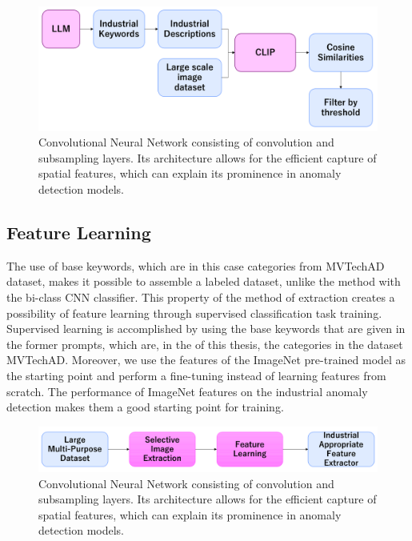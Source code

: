 \begin{figure}[h]
	\begin{center}
		\includegraphics[width=1.0\linewidth]{Chapter_3/llm_extraction.png}
	\end{center}
	\caption{Convolutional Neural Network consisting of convolution and subsampling layers. Its architecture allows for the efficient capture of spatial features, which can explain its prominence in anomaly detection models.}
	\label{fig:cnn}
\end{figure} 	

\subsection{Feature Learning}
\label{feature learning llm}
The use of base keywords, which are in this case categories from MVTechAD dataset, makes it possible to assemble a labeled dataset, unlike the method with the bi-class CNN classifier. This property of the method of extraction creates a possibility of feature learning through supervised classification task training. Supervised learning is accomplished by using the base keywords that are given in the former prompts, which are, in the of this thesis, the categories in the dataset MVTechAD. Moreover, we use the features of the ImageNet pre-trained model as the starting point and perform a fine-tuning instead of learning features from scratch. The performance of ImageNet features on the industrial anomaly detection makes them a good starting point for training.

\begin{figure}[h!]
	\begin{center}
		\includegraphics[width=1.0\linewidth]{Chapter_3/selective_extraction.png}
	\end{center}
	\caption{Convolutional Neural Network consisting of convolution and subsampling layers. Its architecture allows for the efficient capture of spatial features, which can explain its prominence in anomaly detection models.}
	\label{fig:cnn}
\end{figure} 	
